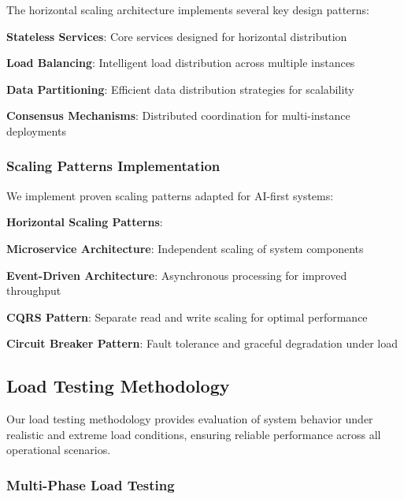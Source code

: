 The horizontal scaling architecture implements several key design patterns:

\begin{expandedlist}
    \item \textbf{Stateless Services}: Core services designed for horizontal distribution
    \item \textbf{Load Balancing}: Intelligent load distribution across multiple instances
    \item \textbf{Data Partitioning}: Efficient data distribution strategies for scalability
    \item \textbf{Consensus Mechanisms}: Distributed coordination for multi-instance deployments
\end{expandedlist}

\subsubsection*{Scaling Patterns Implementation}

We implement proven scaling patterns adapted for AI-first systems:

\begin{successbox}
\textbf{Horizontal Scaling Patterns}:
\begin{compactlist}
    \item \textbf{Microservice Architecture}: Independent scaling of system components
    \item \textbf{Event-Driven Architecture}: Asynchronous processing for improved throughput
    \item \textbf{CQRS Pattern}: Separate read and write scaling for optimal performance
    \item \textbf{Circuit Breaker Pattern}: Fault tolerance and graceful degradation under load
\end{compactlist}
\end{successbox}

\subsection*{Load Testing Methodology}

Our load testing methodology provides evaluation of system behavior under realistic and extreme load conditions, ensuring reliable performance across all operational scenarios.

\subsubsection*{Multi-Phase Load Testing}

